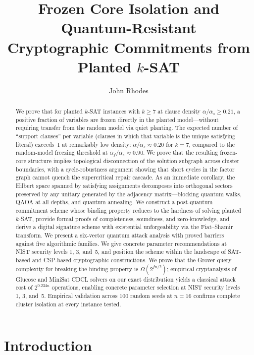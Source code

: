 \documentclass[11pt]{article}
\title{Frozen Core Isolation and Quantum-Resistant\\Cryptographic Commitments from Planted $k$-SAT}
\author{John Rhodes}
\date{}
\begin{document}
\maketitle

\begin{abstract}
We prove that for planted $k$-SAT instances with $k \geq 7$ at clause density $\alpha/\alpha_s \geq 0.21$, a positive fraction of variables are frozen directly in the planted model---without requiring transfer from the random model via quiet planting. The expected number of ``support clauses'' per variable (clauses in which that variable is the unique satisfying literal) exceeds~1 at remarkably low density: $\alpha/\alpha_s \approx 0.20$ for $k = 7$, compared to the random-model freezing threshold at $\alpha_f/\alpha_s \approx 0.90$. We prove that the resulting frozen-core structure implies topological disconnection of the solution subgraph across cluster boundaries, with a cycle-robustness argument showing that short cycles in the factor graph cannot quench the supercritical repair cascade. As an immediate corollary, the Hilbert space spanned by satisfying assignments decomposes into orthogonal sectors preserved by any unitary generated by the adjacency matrix---blocking quantum walks, QAOA at all depths, and quantum annealing. We construct a post-quantum commitment scheme whose binding property reduces to the hardness of solving planted $k$-SAT, provide formal proofs of completeness, soundness, and zero-knowledge, and derive a digital signature scheme with existential unforgeability via the Fiat--Shamir transform.  We present a six-vector quantum attack analysis with proved barriers against five algorithmic families. We give concrete parameter recommendations at NIST security levels 1, 3, and~5, and position the scheme within the landscape of SAT-based and CSP-based cryptographic constructions. We prove that the Grover query complexity for breaking the binding property is $\Omega(2^{fn/2})$; empirical cryptanalysis of Glucose and MiniSat CDCL solvers on our exact distribution yields a classical attack cost of $2^{0.234n}$ operations, enabling concrete parameter selection at NIST security levels 1, 3, and~5. Empirical validation across 100 random seeds at $n = 16$ confirms complete cluster isolation at every instance tested.
\end{abstract}

\section{Introduction}
\end{document}
